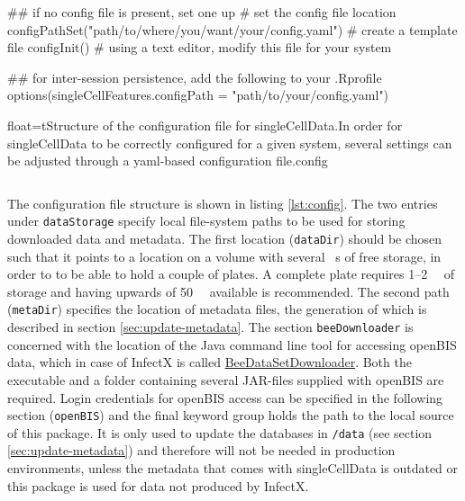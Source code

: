 \begin{rflow}
## if no config file is present, set one up
# set the config file location
configPathSet("path/to/where/you/want/your/config.yaml")
# create a template file
configInit()
# using a text editor, modify this file for your system

## for inter-session persistence, add the following to your .Rprofile
options(singleCellFeatures.configPath = "path/to/your/config.yaml")
\end{rflow}


\begin{rlisting}{float=t}{Structure of the configuration file for singleCellData.}{In order for singleCellData to be correctly configured for a given system, several settings can be adjusted through a yaml-based configuration file.}{config}
  \inputminted[fontsize=\footnotesize,linenos,numbersep=4pt,style=knitr]{yaml}{data/config.yaml}
\end{rlisting}

The configuration file structure is shown in listing \ref{lst:config}. The two entries under \texttt{dataStorage} specify local file-system paths to be used for storing downloaded data and metadata. The first location (\texttt{dataDir}) should be chosen such that it points to a location on a volume with several \si{\giga\byte}s of free storage, in order to to be able to hold a couple of plates. A complete plate requires 1--\SI{2}{\giga\byte} of storage and having upwards of \SI{50}{\giga\byte} available is recommended. The second path (\texttt{metaDir}) specifies the location of metadata files, the generation of which is described in section \ref{sec:update-metadata}. The section \texttt{beeDownloader} is concerned with the location of the Java command line tool for accessing openBIS data, which in case of InfectX is called \href{https://wiki.systemsx.ch/pages/viewpage.action?title=InfectX+Single+Cell+Data+Access&spaceKey=InfectXRTD}{BeeDataSetDownloader}. Both the executable and a folder containing several JAR-files supplied with openBIS are required. Login credentials for openBIS access can be specified in the following section (\texttt{openBIS}) and the final keyword group holds the path to the local source of this package. It is only used to update the databases in \texttt{/data} (see section \ref{sec:update-metadata}) and therefore will not be needed in production environments, unless the metadata that comes with singleCellData is outdated or this package is used for data not produced by InfectX.

